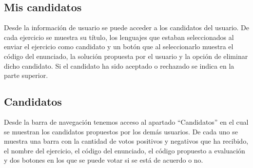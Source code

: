 \subsection{Mis candidatos}

Desde la información de usuario se puede acceder a los candidatos del usuario. De cada ejercicio se muestra su título, los lenguajes que estaban seleccionados al enviar el ejercicio como candidato y un botón que al seleccionarlo muestra el código del enunciado, la solución propuesta por el usuario y la opción de eliminar dicho candidato. Si el candidato ha sido aceptado o rechazado se indica en la parte superior.

\begin{figure}[H]
\begin{center}
\end{center}
\end{figure}

\subsection{Candidatos}

Desde la barra de navegación tenemos acceso al apartado ``Candidatos'' en el cual se muestran los candidatos propuestos por los demás usuarios. De cada uno se muestra una barra con la cantidad de votos positivos y negativos que ha recibido, el nombre del ejercicio, el código del enunciado, el código propuesto a evaluación y dos botones en los que se puede votar si se está de acuerdo o no.

\begin{figure}[H]
\begin{center}
\end{center}
\end{figure}

